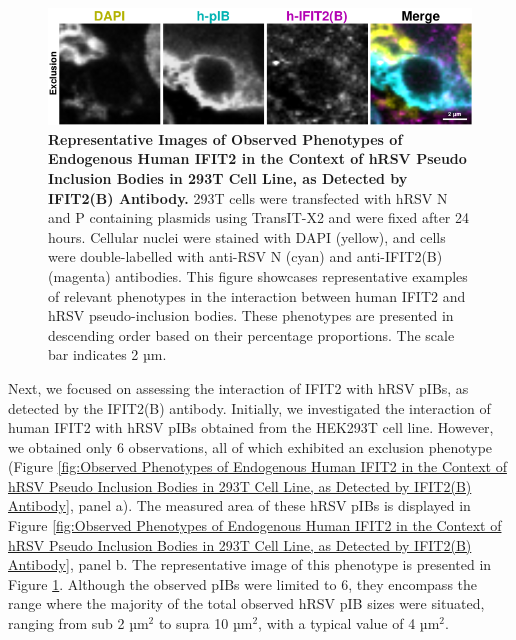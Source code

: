 \begin{figure}
    \centering
    \includegraphics[width=1\linewidth]{09. Chapter 4/Figs/01. pIB/03. IFIT2/03. IFIT2B/03. i2b-293t-hnhp.pdf} 
    \caption[Representative Images of Observed Phenotypes of Endogenous Human IFIT2 in the Context of hRSV Pseudo Inclusion Bodies in 293T Cell Line, as Detected by IFIT2(B) Antibody.]{\textbf{Representative Images of Observed Phenotypes of Endogenous Human IFIT2 in the Context of hRSV Pseudo Inclusion Bodies in 293T Cell Line, as Detected by IFIT2(B) Antibody.} 293T cells were transfected with hRSV N and P containing plasmids using TransIT-X2 and were fixed after 24 hours. Cellular nuclei were stained with DAPI (yellow), and cells were double-labelled with anti-RSV N (cyan) and anti-IFIT2(B) (magenta) antibodies. This figure showcases representative examples of relevant phenotypes in the interaction between human IFIT2 and hRSV pseudo-inclusion bodies. These phenotypes are presented in descending order based on their percentage proportions. The scale bar indicates 2 µm.}
    \label{fig:Representative Images of Observed Phenotypes of Endogenous Human IFIT2 in the Context of hRSV Pseudo Inclusion Bodies in 293T Cell Line, as Detected by IFIT2(B) Antibody}
\end{figure}

Next, we focused on assessing the interaction of IFIT2 with hRSV pIBs, as detected by the IFIT2(B) antibody. Initially, we investigated the interaction of human IFIT2 with hRSV pIBs obtained from the HEK293T cell line. However, we obtained only 6 observations, all of which exhibited an exclusion phenotype (Figure \ref{fig:Observed Phenotypes of Endogenous Human IFIT2 in the Context of hRSV Pseudo Inclusion Bodies in 293T Cell Line, as Detected by IFIT2(B) Antibody}, panel a). The measured area of these hRSV pIBs is displayed in Figure \ref{fig:Observed Phenotypes of Endogenous Human IFIT2 in the Context of hRSV Pseudo Inclusion Bodies in 293T Cell Line, as Detected by IFIT2(B) Antibody}, panel b. The representative image of this phenotype is presented in Figure \ref{fig:Representative Images of Observed Phenotypes of Endogenous Human IFIT2 in the Context of hRSV Pseudo Inclusion Bodies in 293T Cell Line, as Detected by IFIT2(B) Antibody}. Although the observed pIBs were limited to 6, they encompass the range where the majority of the total observed hRSV pIB sizes were situated, ranging from sub 2 \(\mbox{µm}^2\) to supra 10 \(\mbox{µm}^2\), with a typical value of 4 \(\mbox{µm}^2\).

